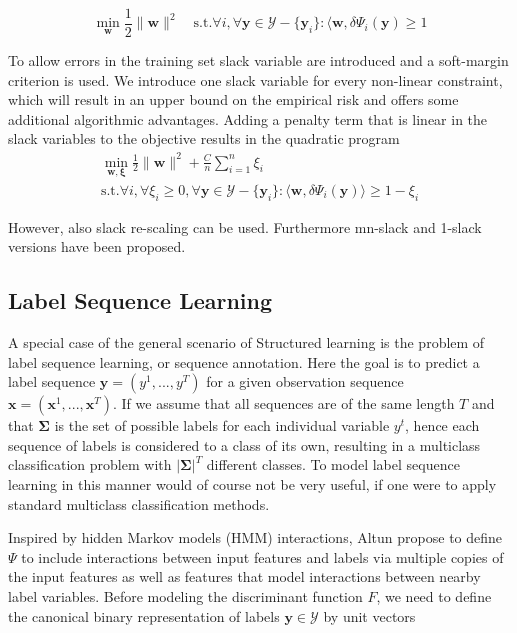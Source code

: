 \begin{equation} 
\min_{\mathbf{w}} \frac{1}{2} \lVert \mathbf{w} \rVert^2 \quad \text{s.t.} \forall i, \forall \mathbf{y} \in \mathcal{Y}-\{\mathbf{y}_i\}: \langle \mathbf{w},\delta\Psi_i(\mathbf{y}) \geq 1
\end{equation}

To allow errors in the training set slack variable are introduced and a soft-margin criterion is used. We introduce one slack variable for every non-linear constraint, which will result in an upper bound on the empirical risk and offers some additional algorithmic advantages. Adding a penalty term that is linear in the slack variables to the objective results in the quadratic program
\begin{eqnarray} \label{eq:svm}
\min_{\mathbf{w},\mathbf{\xi}} \frac{1}{2} \lVert \mathbf{w} \rVert^2 + \frac{C}{n} \sum_{i=1}^n \xi_i \nonumber \\
\text{s.t.} \forall i, \forall\xi_i \geq 0, \forall \mathbf{y} \in \mathcal{Y}-\{\mathbf{y}_i\}: 
\langle \mathbf{w},\delta\Psi_i(\mathbf{y})\rangle \geq 1 - \xi_i
\end{eqnarray}

However, also slack re-scaling can be used. Furthermore mn-slack and 1-slack versions have been proposed.

\subsection{Label Sequence Learning}
\label{svmhmm}
A special case of the general scenario of Structured learning is the problem of label sequence learning, or sequence annotation. Here the goal is to predict a label sequence $\mathbf{y} = (y^1,...,y^T)$ for a given observation sequence $\mathbf{x} = (\mathbf{x}^1,...,\mathbf{x}^T)$. If we assume that all sequences are of the same length $T$ and that $\mathbf{\Sigma}$ is the set of possible labels for each individual variable $y^t$, hence each sequence of labels is considered to a class of its own, resulting in a multiclass classification problem with $|\mathbf{\Sigma}|^T$ different classes. To model label sequence learning in this manner would of course not be very useful, if one were to apply standard multiclass classification methods.

Inspired by hidden Markov models (HMM) interactions, Altun \etal \cite{altun2003hidden} propose to define $\Psi$ to include interactions between input features and labels via multiple copies of the input features as well as features that model interactions between nearby label variables. Before modeling the discriminant function $F$, we need to define the canonical binary representation of labels $\mathbf{y} \in \mathcal{Y}$ by unit vectors

